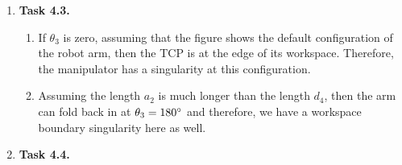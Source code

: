 \documentclass[a4paper,11pt]{article}
\begin{document}
\begin {enumerate}
\begin{enumerate}
		\end{enumerate}				
		
		
	\item[\textbf{Task 4.3.}]
		\begin{enumerate}
			\item If $\theta_3$ is zero, assuming that the figure shows the default configuration of the robot arm, then the TCP is at the edge of its workspace. Therefore, the manipulator has a singularity at this configuration.
			\item Assuming the length $a_2$ is much longer than the length $d_4$, then the arm can fold back in at $\theta_3 = 180\degree$ and therefore, we have a workspace boundary singularity here as well.
		\end{enumerate}
	

	\item[\textbf{Task 4.4.}]
	
\end {enumerate}
\end{document}
